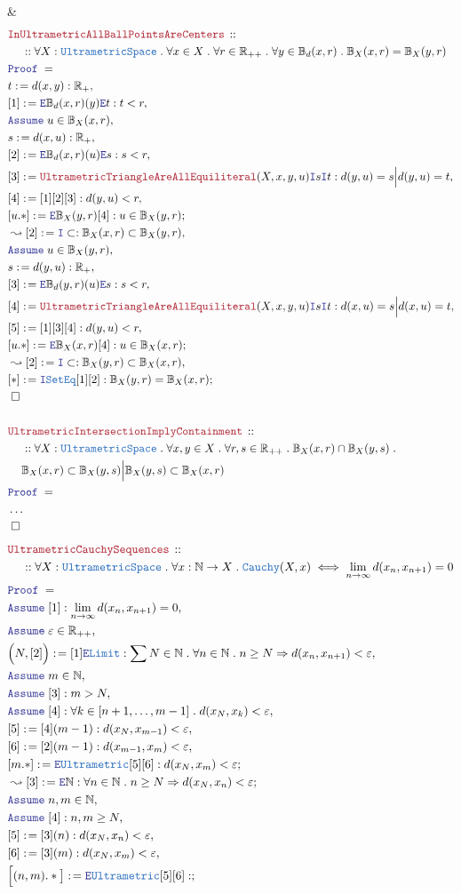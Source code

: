 \documentclass[12pt]{scrartcl}
\newcommand{\TYPE}[1]{\textcolor{NavyBlue}{\mathtt{#1}}}
\newcommand{\LOGIC}[1]{\textcolor{Blue}{\mathtt{#1}}}
\newcommand{\THM}[1]{\textcolor{Maroon}{\mathtt{#1}}}
\renewcommand{\.}{\; . \;}
\newcommand{\de}{: \kern 0.1pc =}
\newcommand{\Theorem}[2]{& \THM{#1} \, :: \, #2 \\ & \Proof = \\ }
\newcommand{\NewLine}{\\ & \kern 1pc}
\newcommand{\Page}[1]{ \begin{align*} #1 \end{align*}   }
\newcommand{\NoProof}{ & \ldots \\ \EndProof}
\newcommand{\Imply}{\Rightarrow}
\newcommand{\Intro}{\LOGIC{I}}
\newcommand{\Elim}{\LOGIC{E}}
\newcommand{\Reals}{\mathbb{R} }
\newcommand{\Ball}{\mathbb{B}}
\newcommand{\Nat}{\mathbb{N} }
\newcommand{\Say}[3]{& #1 \de #2 : #3, \\}
\newcommand{\Conclude}[3]{& #1 \de #2 : #3; \\}
\newcommand{\Derive}[3]{& \leadsto #1 \de #2 : #3, \\}
\newcommand{\DeriveConclude}[3]{& \leadsto #1 \de #2 : #3 ; \\}
\newcommand{\Assume}[2]{& \LOGIC{Assume} \; #1 : #2, \\}
\newcommand{\AssumeIn}[2]{& \LOGIC{Assume} \; #1 \in #2, \\}
\newcommand{\QED}{\; \square}
\newcommand{\EndProof}{& \QED \\}
\newcommand{\Proof}{\LOGIC{Proof} \; }
\begin{document}
{	\EndProof
}\Page{
	\Theorem{InUltrametricAllBallPointsAreCenters}
	{
		\NewLine ::
		\forall X : \TYPE{UltrametricSpace} \.
		\forall x \in X \.
		\forall r \in \Reals_{++} \.
		\forall y \in \mathbb{B}_d(x,r) \.
		\mathbb{B}_X(x,r) = \mathbb{B}_X(y,r)
	}
	\Say{t}{d(x,y)}{\Reals_+}
	\Say{[1]}{\Elim \Ball_d(x,r)(y)\Elim t }{t < r} 
	\AssumeIn{u}{\Ball_X(x,r)}
	\Say{s}{d(x,u)}{\Reals_+}
	\Say{[2]}{\Elim \Ball_d(x,r)(u)\Elim s}{s < r}
	\Say{[3]}{\THM{UltrametricTriangleAreAllEquiliteral}(X,x,y,u)\Intro s \Intro t}
	{
		d(y,u) = s \Big| d(y,u) = t
	}
	\Say{[4]}{[1][2][3]}{d(y,u) < r}
	\Conclude{[u.*]}{\Elim \Ball_X(y,r)[4]}{u \in \Ball_X(y,r)}
	\Derive{[2]}{\Intro \subset}{\Ball_X(x,r) \subset \Ball_X(y,r)}
	\AssumeIn{u}{\Ball_X(y,r)}
	\Say{s}{d(y,u)}{\Reals_+}
	\Say{[3]}{\Elim \Ball_d(y,r)(u)\Elim s}{s < r}
	\Say{[4]}{\THM{UltrametricTriangleAreAllEquiliteral}(X,x,y,u)\Intro s \Intro t}
	{
		d(x,u) = s \Big| d(x,u) = t
	}
	\Say{[5]}{[1][3][4]}{d(y,u) < r}
	\Conclude{[u.*]}{\Elim \Ball_X(x,r)[4]}{u \in \Ball_X(x,r)}
	\Derive{[2]}{\Intro \subset}{\Ball_X(y,r) \subset \Ball_X(x,r)}
	\Conclude{[*]}{\Intro \TYPE{SetEq}[1][2]}{\Ball_X(y,r) = \Ball_X(x,r)}
	\EndProof
	\\
	\Theorem{UltrametricIntersectionImplyContainment}
	{
		\NewLine ::
		\forall X : \TYPE{UltrametricSpace} \.
		\forall x,y \in X \.
		\forall r,s \in \Reals_{++} \.
		\Ball_X(x,r) \cap \Ball_X(y,s) \.
		\NewLine
		\Ball_X(x,r) \subset \Ball_X(y,s)
		\Big|
		\Ball_X(y,s) \subset \Ball_X(x,r)
	}
	\NoProof
}\Page{
	\Theorem{UltrametricCauchySequences}
	{
		\NewLine ::
		\forall X : \TYPE{UltrametricSpace} \.
		\forall x : \Nat \to X \.
		\TYPE{Cauchy}(X,x) 
		\iff
		\lim_{n \to \infty} d(x_n,x_{n+1}) = 0
	}
	\Assume{[1]}{\lim_{n \to \infty} d(x_n,x_{n+1}) = 0}
	\AssumeIn{\varepsilon}{\Reals_{++}}
	\Say{\Big(N,[2]\Big)}{[1]\Elim \TYPE{Limit}}
	{
		\sum N \in \Nat \.
		\forall n \in \Nat \. 
		n \ge N
		\Imply
		d(x_n,x_{n+1}) < \varepsilon
	}
	\AssumeIn{m}{\Nat}
	\Assume{[3]}{m > N}
	\Assume{[4]}
	{
		\forall k \in [n+1,\ldots,m-1] \. 
		d(x_N,x_k) < \varepsilon
	}
	\Say{[5]}{[4](m-1)}
	{
		d(x_N,x_{m-1}) < \varepsilon
	}
	\Say{[6]}{[2](m-1)}
	{
		d(x_{m-1},x_m) < \varepsilon
	}
	\Conclude{[m.*]}{\Elim \TYPE{Ultrametric}[5][6]}
	{
		d(x_N,x_m) < \varepsilon
	}
	\DeriveConclude{[3]}{\Elim \Nat}
	{
		\forall n \in \Nat \. n \ge N \Imply d(x_N,x_n) < \varepsilon
	}
	\AssumeIn{n,m}{\Nat}
	\Assume{[4]}{n,m \ge N}
	\Say{[5]}{[3](n)}{d(x_N,x_n) < \varepsilon}
	\Say{[6]}{[3](m)}{d(x_N,x_m) < \varepsilon}
	\Conclude{\Big[(n,m).* \big]}{\Elim \TYPE{Ultrametric}[5][6]}
	{
}}
\end{document}
